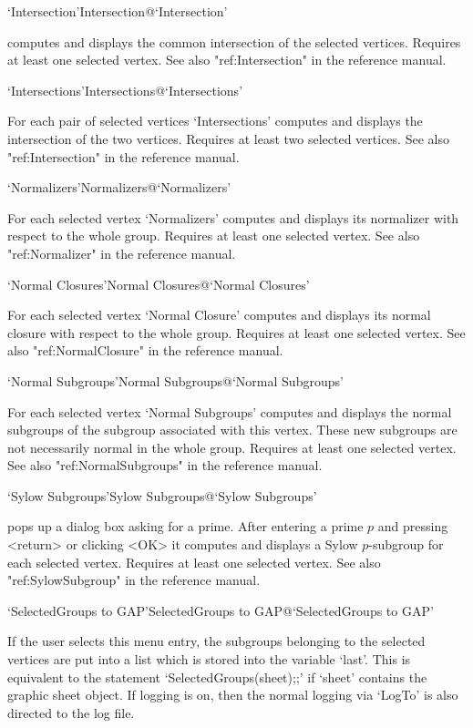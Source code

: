 \>`Intersection'{Intersection}@{`Intersection'}

computes and displays the common intersection of the selected vertices.
Requires at least one selected vertex.  See also "ref:Intersection" in the
{\GAP} reference manual.

\>`Intersections'{Intersections}@{`Intersections'}

For each pair of selected vertices `Intersections' computes and displays
the intersection of the two vertices.  Requires at least two selected
vertices.  See also "ref:Intersection" in the {\GAP}
reference manual.

\>`Normalizers'{Normalizers}@{`Normalizers'}

For each selected vertex `Normalizers' computes and displays its normalizer
with respect to the whole group.  Requires at least one selected vertex.
See also "ref:Normalizer" in the {\GAP}
reference manual.

\>`Normal Closures'{Normal Closures}@{`Normal Closures'}

For each selected vertex `Normal Closure' computes and displays its normal
closure with respect to the whole group.  Requires at least one selected
vertex.  See also "ref:NormalClosure" in the {\GAP}
reference manual.

\>`Normal Subgroups'{Normal Subgroups}@{`Normal Subgroups'}

For   each selected vertex `Normal  Subgroups'  computes and displays the
normal subgroups of the subgroup associated  with this vertex.  These new
subgroups are not  necessarily  normal in the  whole  group.  Requires at
least one selected vertex.  See also "ref:NormalSubgroups" in the {\GAP}
reference manual.

\>`Sylow Subgroups'{Sylow Subgroups}@{`Sylow Subgroups'}

pops  up a dialog  box asking   for a prime.   After entering  a  prime $p$ 
and pressing  <return> or  clicking  <OK> it computes   and displays  a Sylow
$p$-subgroup  for   each selected vertex.  Requires   at   least one selected
vertex.  See also "ref:SylowSubgroup" in the {\GAP}
reference manual.

\>`SelectedGroups to GAP'{SelectedGroups to GAP}@{`SelectedGroups to GAP'}

If  the  user  selects  this menu entry,  the  subgroups   belonging to the
selected  vertices are put into a  list which  is  stored into the variable
`last'.  This is equivalent  to the  statement `SelectedGroups(sheet);;' if
`sheet' contains the graphic sheet  object. If {\XGAP}  logging is on, then
the normal {\GAP} logging via `LogTo'  is also directed  to the {\XGAP} log
file.

